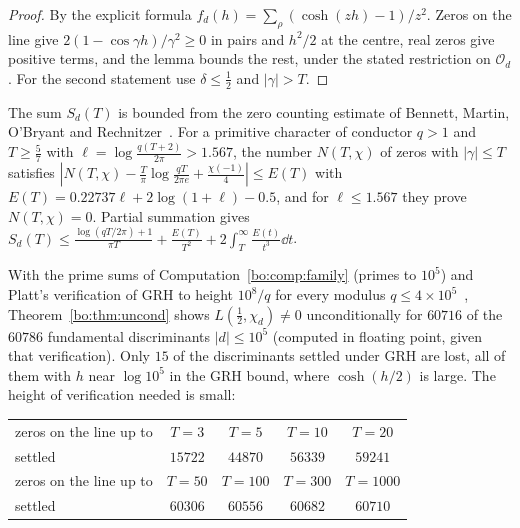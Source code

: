 \begin{proof}
By the explicit formula $f_d(h)=\sum_\rho(\cosh(zh)-1)/z^2$. Zeros on the line give $2(1-\cos\gamma h)/\gamma^2\ge0$ in pairs and $h^2/2$ at the centre, real zeros give positive terms, and the lemma bounds the rest, under the stated restriction on $\mathcal O_d$. For the second statement use $\delta\le\frac12$ and $|\gamma|>T$.
\end{proof}

The sum $S_d(T)$ is bounded from the zero counting estimate of Bennett, Martin, O'Bryant and Rechnitzer~\cite{BMOR21}. For a primitive character of conductor $q>1$ and $T\ge\frac57$ with $\ell=\log\frac{q(T+2)}{2\pi}>1.567$, the number $N(T,\chi)$ of zeros with $|\gamma|\le T$ satisfies $|N(T,\chi)-\frac T\pi\log\frac{qT}{2\pi e}+\frac{\chi(-1)}4|\le E(T)$ with $E(T)=0.22737\ell+2\log(1+\ell)-0.5$, and for $\ell\le1.567$ they prove $N(T,\chi)=0$. Partial summation gives $S_d(T)\le\frac{\log(qT/2\pi)+1}{\pi T}+\frac{E(T)}{T^2}+2\int_T^\infty\frac{E(t)}{t^3}\dd t$.

\begin{computation}\label{bo:comp:uncond}
With the prime sums of Computation~\ref{bo:comp:family} (primes to $10^5$) and Platt's verification of GRH to height $10^8/q$ for every modulus $q\le4\times10^5$~\cite{Platt16}, Theorem~\ref{bo:thm:uncond} shows $L(\frac12,\chi_d)\ne0$ unconditionally for $60716$ of the $60786$ fundamental discriminants $|d|\le10^5$ (computed in floating point, given that verification). Only $15$ of the discriminants settled under GRH are lost, all of them with $h$ near $\log10^5$ in the GRH bound, where $\cosh(h/2)$ is large. The height of verification needed is small:
\begin{center}\small
\begin{tabular}{@{}lcccc@{}}
\toprule
zeros on the line up to & $T=3$ & $T=5$ & $T=10$ & $T=20$\\
settled & $15722$ & $44870$ & $56339$ & $59241$\\
\midrule
zeros on the line up to & $T=50$ & $T=100$ & $T=300$ & $T=1000$\\
settled & $60306$ & $60556$ & $60682$ & $60710$\\
\bottomrule
\end{tabular}
\end{center}
\end{computation}


